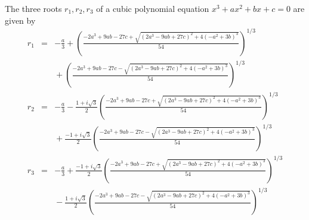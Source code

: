 \documentclass[12pt]{article}
\newcommand{\0}{\bf{0}}
\newcommand{\<}{\langle}
\renewcommand{\>}{\rangle}
\begin{document}
The three roots $r_1, r_2, r_3$ of a cubic polynomial equation $x^3 + ax^2 + bx + c = 0$ are given by
\begin{eqnarray*}
r_1 & = & -\frac{a}{3} + \left(\frac{-2a^3 + 9ab - 27c + \sqrt{(2a^3-9ab+27c)^2 + 4(-a^2+3b)^3}}{54}\right)^{1/3} \\
& & {} + \left(\frac{-2a^3 + 9ab - 27c - \sqrt{(2a^3-9ab+27c)^2 + 4(-a^2+3b)^3}}{54}\right)^{1/3} \\
r_2 & = & -\frac{a}{3} - \frac{1+i\sqrt{3}}{2} \left(\frac{-2a^3 + 9ab - 27c + \sqrt{(2a^3-9ab+27c)^2 + 4(-a^2+3b)^3}}{54}\right)^{1/3} \\
& & {} + \frac{-1+i\sqrt{3}}{2} \left(\frac{-2a^3 + 9ab - 27c - \sqrt{(2a^3-9ab+27c)^2 + 4(-a^2+3b)^3}}{54}\right)^{1/3} \\
r_3 & = & -\frac{a}{3} + \frac{-1+i\sqrt{3}}{2} \left(\frac{-2a^3 + 9ab - 27c + \sqrt{(2a^3-9ab+27c)^2 + 4(-a^2+3b)^3}}{54}\right)^{1/3} \\
& & {} - \frac{1+i\sqrt{3}}{2} \left(\frac{-2a^3 + 9ab - 27c - \sqrt{(2a^3-9ab+27c)^2 + 4(-a^2+3b)^3}}{54}\right)^{1/3}
\end{eqnarray*}
\end{document}
